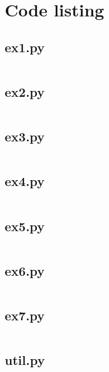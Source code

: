 \documentclass[10pt,a4paper,oneside,onecolumn]{article}
\begin{document}
\onecolumn
\appendixpage
\appendix

\section{Code listing}

\subsection{ex1.py}\label{app:ex1}
\inputminted{python}{../src/ex1.py}
\newpage

\subsection{ex2.py}\label{app:ex2}
\inputminted{python}{../src/ex2.py}
\newpage

\subsection{ex3.py}\label{app:ex3}
\inputminted{python}{../src/ex3.py}
\newpage

\subsection{ex4.py}\label{app:ex4}
\inputminted{python}{../src/ex4.py}
\newpage

\subsection{ex5.py}\label{app:ex5}
\inputminted{python}{../src/ex5.py}
\newpage

\subsection{ex6.py}\label{app:ex6}
\inputminted{python}{../src/ex6.py}
\newpage

\subsection{ex7.py}\label{app:ex7}
\inputminted{python}{../src/ex7.py}
\newpage

\subsection{util.py}\label{app:util}
\inputminted{python}{../src/util.py}
\end{document}
